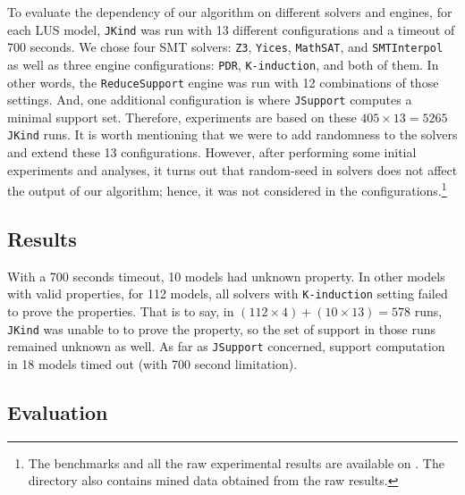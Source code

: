 To evaluate the dependency of our algorithm on different solvers and engines, for each LUS model, \texttt{JKind} was run with 13 different configurations and a timeout of 700 seconds. We chose four SMT solvers: \texttt{Z3}, \texttt{Yices}, \texttt{MathSAT}, and \texttt{SMTInterpol} as well as three engine configurations: \texttt{PDR},
\texttt{K-induction}, and both of them. In other words, the \texttt{ReduceSupport} engine was run with 12 combinations of those settings. And, one additional configuration is where \texttt{JSupport} computes a minimal support set. Therefore, experiments are based on these $405 \times 13 = 5265$ \texttt{JKind} runs. It is worth mentioning that we were to add randomness to the solvers and extend these 13 configurations. However, after performing some initial experiments and analyses, it turns out that random-seed in solvers does not affect the output of our algorithm; hence, it was not considered in the configurations.\footnote{The benchmarks and all the raw experimental results are available on \cite{expr}. The directory also contains mined data obtained from the raw results.}

\subsection{Results}
With a 700 seconds timeout, 10 models had unknown property. In other models with valid properties, for 112 models, all solvers with \texttt{K-induction} setting failed to prove the properties. That is to say, in $(112 \times 4) + (10 \times 13) = 578$ runs, \texttt{JKind} was unable to to prove the property, so the set of support in those runs remained unknown as well. As far as \texttt{JSupport} concerned, support computation in 18 models timed out (with 700 second limitation). 

\subsection{Evaluation}
\label{subsec:eval}

